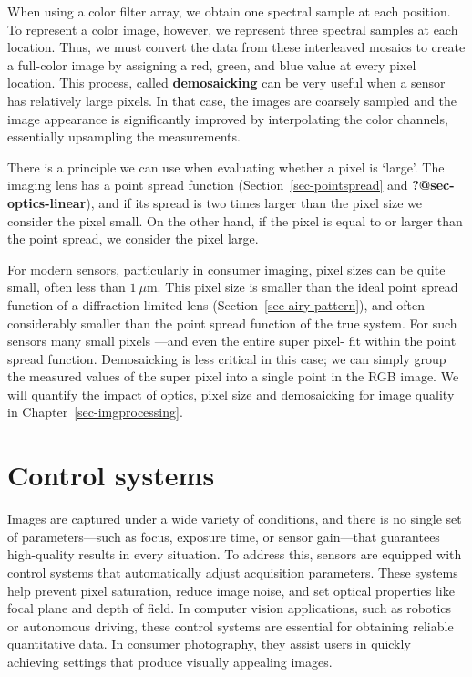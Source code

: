 \documentclass[
  letterpaper,
]{book}
\begin{document}
When using a color filter array, we obtain one spectral sample at each
position. To represent a color image, however, we represent three
spectral samples at each location. Thus, we must convert the data from
these interleaved mosaics to create a full-color image by assigning a
red, green, and blue value at every pixel location. This process, called
\textbf{demosaicking} can be very useful when a sensor has relatively
large pixels. In that case, the images are coarsely sampled and the
image appearance is significantly improved by interpolating the color
channels, essentially upsampling the measurements.

There is a principle we can use when evaluating whether a pixel is
`large'. The imaging lens has a point spread function
(Section~\ref{sec-pointspread} and \textbf{?@sec-optics-linear}), and if
its spread is two times larger than the pixel size we consider the pixel
small. On the other hand, if the pixel is equal to or larger than the
point spread, we consider the pixel large.

For modern sensors, particularly in consumer imaging, pixel sizes can be
quite small, often less than \(1~\mu \text{m}\). This pixel size is
smaller than the ideal point spread function of a diffraction limited
lens (Section~\ref{sec-airy-pattern}), and often considerably smaller
than the point spread function of the true system. For such sensors many
small pixels ---and even the entire super pixel- fit within the point
spread function. Demosaicking is less critical in this case; we can
simply group the measured values of the super pixel into a single point
in the RGB image. We will quantify the impact of optics, pixel size and
demosaicking for image quality in Chapter~\ref{sec-imgprocessing}.

\chapter{Control systems}\label{sec-sensor-control}

Images are captured under a wide variety of conditions, and there is no
single set of parameters---such as focus, exposure time, or sensor
gain---that guarantees high-quality results in every situation. To
address this, sensors are equipped with control systems that
automatically adjust acquisition parameters. These systems help prevent
pixel saturation, reduce image noise, and set optical properties like
focal plane and depth of field. In computer vision applications, such as
robotics or autonomous driving, these control systems are essential for
obtaining reliable quantitative data. In consumer photography, they
assist users in quickly achieving settings that produce visually
appealing images.
\end{document}
